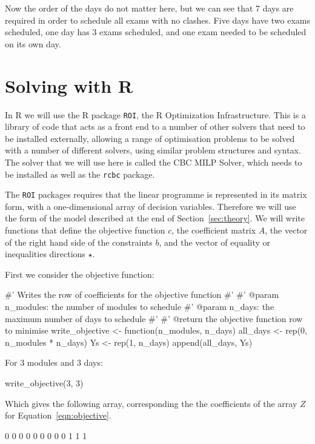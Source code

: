 Now the order of the days do not matter here, but we can see that 7 days are
required in order to schedule all exams with no clashes. Five days have two
exams scheduled, one day has 3 exams scheduled, and one exam needed to be
scheduled on its own day.


\section{Solving with R}\label{sec:solving-with-R}

In R we will use the R package \texttt{ROI}, the R Optimization
Infrastructure.
This is a library of code that acts as a front end to a number of other solvers
that need to be installed externally, allowing a range of optimisation problems
to be solved with a number of different solvers, using similar problem
structures and syntax.
The solver that we will use here is called the CBC MILP Solver, which needs to
be installed as well as the \texttt{rcbc} package.

The \texttt{ROI} packages requires that the linear programme is
represented in its matrix form, with a one-dimensional array of decision
variables. Therefore we will use the form of the model described at the end of
Section~\ref{sec:theory}.
We will write functions that define the objective function $c$, the coefficient
matrix $A$, the vector of the right hand side of the constraints $b$, and the
vector of equality or inequalities directions $\star$.

First we consider the objective function:

\begin{Rin}
#' Writes the row of coefficients for the objective function
#'
#' @param n_modules: the number of modules to schedule
#' @param n_days: the maximum number of days to schedule
#'
#' @return the objective function row to minimise
write_objective <- function(n_modules, n_days){
  all_days <- rep(0, n_modules * n_days)
  Ys <- rep(1, n_days)
  append(all_days, Ys)
}
\end{Rin}

For 3 modules and 3 days:

\begin{Rin}
write_objective(3, 3)
\end{Rin}

Which gives the following array, corresponding the the coefficients of the
array $Z$ for Equation~\ref{eqn:objective}.

\begin{Rout}
[1] 0 0 0 0 0 0 0 0 0 1 1 1
\end{Rout}

